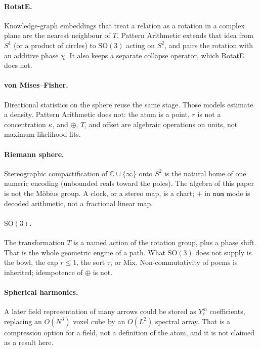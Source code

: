 \documentclass[12pt, a4paper]{article}
\begin{document}
\paragraph{RotatE.}
Knowledge-graph embeddings that treat a relation as a rotation in a
complex plane are the nearest neighbour of $T$. Pattern Arithmetic
extends that idea from $S^1$ (or a product of circles) to
$\mathrm{SO}(3)$ acting on $S^2$, and pairs the rotation with an
additive phase $\chi$. It also keeps a separate collapse operator,
which RotatE does not.

\paragraph{von Mises--Fisher.}
Directional statistics on the sphere reuse the same stage.
Those models estimate a density. Pattern Arithmetic does not: the atom
is a point, $r$ is not a concentration $\kappa$, and $\oplus$, $T$, and
offset are algebraic operations on units, not maximum-likelihood fits.

\paragraph{Riemann sphere.}
Stereographic compactification of $\mathbb{C}\cup\{\infty\}$ onto $S^2$
is the natural home of one numeric encoding (unbounded reals toward the
poles). The algebra of this paper is not the M\"obius group. A clock,
or a stereo map, is a chart; $+$ in $\mathtt{num}$ mode is decoded
arithmetic, not a fractional linear map.

\paragraph{$\mathrm{SO}(3)$.}
The transformation $T$ is a named action of the rotation group, plus a
phase shift. That is the whole geometric engine of a path. What
$\mathrm{SO}(3)$ does not supply is the bowl, the cap $r\le 1$, the
sort $\tau$, or Mix. Non-commutativity of poems is inherited;
idempotence of $\oplus$ is not.

\paragraph{Spherical harmonics.}
A later field representation of many arrows could be stored as
$Y_\ell^m$ coefficients, replacing an $O(N^3)$ voxel cube by an
$O(L^2)$ spectral array. That is a compression option for a field, not
a definition of the atom, and it is not claimed as a result here.
\end{document}
